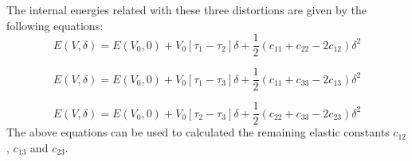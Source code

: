 The internal energies related with these three distortions are given by the following equations:
\begin{equation}
E(V,\delta) = E(V_0, 0) + V_0\left [ \tau_1 - \tau_2 \right ] \delta + \frac{1}{2} \left(c_{11} + c_{22} -2c_{12}  \right)\delta^2
\end{equation}

\begin{equation}
E(V,\delta) = E(V_0, 0) + V_0\left [ \tau_1 - \tau_3 \right ] \delta + \frac{1}{2} \left(c_{11} + c_{33} -2c_{13}  \right)\delta^2
\end{equation}

\begin{equation}
E(V,\delta) = E(V_0, 0) + V_0\left [ \tau_2 - \tau_3 \right ] \delta + \frac{1}{2} \left(c_{22} + c_{33} -2c_{23}  \right)\delta^2
\end{equation}
The above equations can be used to calculated the remaining elastic constants $c_{12}$, $c_{13}$ and $c_{23}$.




